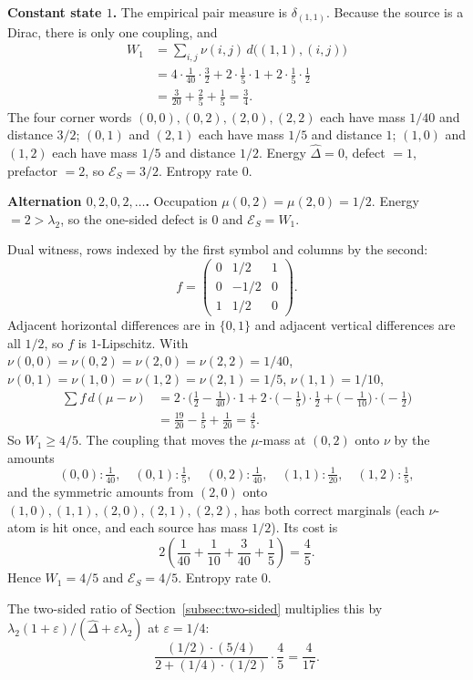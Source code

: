 \documentclass[11pt,reqno]{amsart}
\theoremstyle{remark}
\newcommand{\ES}{\mathcal{E}_S}
\begin{document}
\medskip\noindent\textbf{Constant state $1$.} The empirical pair measure is $\delta_{(1,1)}$. Because the source is a Dirac, there is only one coupling, and
\begin{align*}
W_1
&= \sum_{i,j} \nu(i,j)\, d\bigl((1,1),(i,j)\bigr) \\
&= 4\cdot\frac{1}{40}\cdot\frac32 + 2\cdot\frac15\cdot 1 + 2\cdot\frac15\cdot\frac12 \\
&= \frac{3}{20} + \frac25 + \frac15
= \frac34.
\end{align*}
The four corner words $(0,0),(0,2),(2,0),(2,2)$ each have mass $1/40$ and distance $3/2$; $(0,1)$ and $(2,1)$ each have mass $1/5$ and distance $1$; $(1,0)$ and $(1,2)$ each have mass $1/5$ and distance $1/2$. Energy $\hat\Delta = 0$, defect $= 1$, prefactor $= 2$, so $\ES = 3/2$. Entropy rate $0$.

\medskip\noindent\textbf{Alternation $0,2,0,2,\ldots$.} Occupation $\mu(0,2) = \mu(2,0) = 1/2$. Energy $= 2 > \lambda_2$, so the one-sided defect is $0$ and $\ES = W_1$.

Dual witness, rows indexed by the first symbol and columns by the second:
\[
f = \begin{pmatrix}
0 & 1/2 & 1 \\
0 & -1/2 & 0 \\
1 & 1/2 & 0
\end{pmatrix}.
\]
Adjacent horizontal differences are in $\{0,1\}$ and adjacent vertical differences are all $1/2$, so $f$ is $1$-Lipschitz. With $\nu(0,0)=\nu(0,2)=\nu(2,0)=\nu(2,2)=1/40$, $\nu(0,1)=\nu(1,0)=\nu(1,2)=\nu(2,1)=1/5$, $\nu(1,1)=1/10$,
\begin{align*}
\sum f\,d(\mu-\nu)
&= 2\cdot\bigl(\tfrac12 - \tfrac{1}{40}\bigr)\cdot 1
+ 2\cdot\bigl(-\tfrac15\bigr)\cdot\tfrac12
+ \bigl(-\tfrac{1}{10}\bigr)\cdot\bigl(-\tfrac12\bigr) \\
&= \tfrac{19}{20} - \tfrac15 + \tfrac{1}{20}
= \tfrac45.
\end{align*}
So $W_1 \ge 4/5$. The coupling that moves the $\mu$-mass at $(0,2)$ onto $\nu$ by the amounts
\[
(0,0):\tfrac{1}{40},\quad
(0,1):\tfrac15,\quad
(0,2):\tfrac{1}{40},\quad
(1,1):\tfrac{1}{20},\quad
(1,2):\tfrac15,
\]
and the symmetric amounts from $(2,0)$ onto $(1,0),(1,1),(2,0),(2,1),(2,2)$, has both correct marginals (each $\nu$-atom is hit once, and each source has mass $1/2$). Its cost is
\[
2\left(\frac{1}{40} + \frac{1}{10} + \frac{3}{40} + \frac15\right) = \frac45.
\]
Hence $W_1 = 4/5$ and $\ES = 4/5$. Entropy rate $0$.

The two-sided ratio of Section~\ref{subsec:two-sided} multiplies this by $\lambda_2(1+\varepsilon)/(\hat\Delta+\varepsilon\lambda_2)$ at $\varepsilon=1/4$:
\[
\frac{(1/2)\cdot(5/4)}{2 + (1/4)\cdot(1/2)} \cdot \frac45 = \frac{4}{17}.
\]
\end{document}
